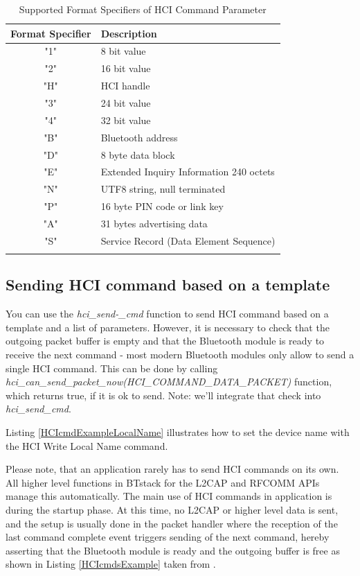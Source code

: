 \documentclass[a4paper,titlepage,oneside,12pt]{amsart} %
\begin{document}
\begin{table}\centering
\caption{Supported Format Specifiers of HCI Command Parameter}
\begin{tabular}{cl}\toprule
Format Specifier & Description\\ 
\midrule
"1" & 8 bit value \\
"2" & 16 bit value \\
"H" & HCI handle \\
"3" & 24 bit value \\
"4" & 32 bit value \\
"B" & Bluetooth address \\
"D" & 8 byte data block \\
"E" & Extended Inquiry Information 240 octets \\
"N" & UTF8 string, null terminated \\
"P" & 16 byte PIN code or link key \\
"A" & 31 bytes advertising data \\
"S" & Service Record (Data Element Sequence)\\
\bottomrule
\label{table:hciformat}
\end{tabular}
\end{table}

\subsection{Sending  HCI command based on a template}
You can use the \emph{hci\_send-\_cmd} function to send HCI command based on a template and a list of parameters. However, it is necessary to check that the outgoing packet buffer is empty and that the Bluetooth module is ready to receive the next command - most modern Bluetooth modules only allow  to send a single HCI command. This can be done by calling \emph{hci\_can\_send\_packet\_now(HCI\_COMMAND\_DATA\_PACKET)} function, which returns true, if it is ok to send. Note: we'll integrate that check into \emph{hci\_send\_cmd}.

Listing \ref{HCIcmdExampleLocalName} illustrates how to set the device name with the HCI Write Local Name command.

Please note, that an application rarely has to send HCI commands on its own. All higher level functions in BTstack for the L2CAP and RFCOMM APIs manage this automatically. The main use of HCI commands in application is during the startup phase. At this time, no L2CAP or higher level data is sent, and the setup is usually done in the packet handler where the reception of the last  command complete event triggers sending of the next command, hereby asserting that the Bluetooth module is ready and the outgoing buffer is free as shown in Listing \ref{HCIcmdsExample} taken from .
\end{document}
